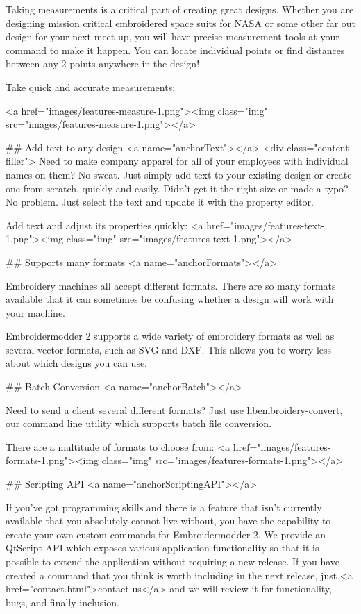 \documentclass[a4paper, 11pt]{report}
\begin{document}
Taking measurements is a critical part of creating great designs. Whether you are designing mission critical embroidered space suits for NASA or some other far out design for your next meet-up, you will have precise measurement tools at your command to make it happen. You can locate individual points or find distances between any 2 points anywhere in the design!

Take quick and accurate measurements:

<a href="images/features-measure-1.png"><img class="img" src="images/features-measure-1.png"></a>

## Add text to any design
<a name="anchorText"></a>
<div class="content-filler">
Need to make company apparel for all of your employees with individual names on them? No sweat. Just simply add text to your existing design or create one from scratch, quickly and easily.
Didn't get it the right size or made a typo? No problem. Just select the text and update it with the property editor.

Add text and adjust its properties quickly:
<a href="images/features-text-1.png"><img class="img" src="images/features-text-1.png"></a>

## Supports many formats
<a name="anchorFormats"></a>

Embroidery machines all accept different formats. There are so many formats available that it can sometimes be confusing whether a design will work with your machine.

Embroidermodder 2 supports a wide variety of embroidery formats as well as several vector formats, such as SVG and DXF. This allows you to worry less about which designs you can use.

## Batch Conversion
<a name="anchorBatch"></a>

Need to send a client several different formats? Just use libembroidery-convert, our command line utility which supports batch file conversion.

There are a multitude of formats to choose from:
<a href="images/features-formats-1.png"><img class="img" src="images/features-formats-1.png"></a>

## Scripting API
<a name="anchorScriptingAPI"></a>

If you've got programming skills and there is a feature that isn't currently available that you absolutely cannot live without, you have the capability to create your own custom commands for Embroidermodder 2. We provide an QtScript API which exposes various application functionality so that it is possible to extend the application without requiring a new release. If you have created a command that you think is worth including in the next release, just <a href="contact.html">contact us</a> and we will review it for functionality, bugs, and finally inclusion.
\end{document}
